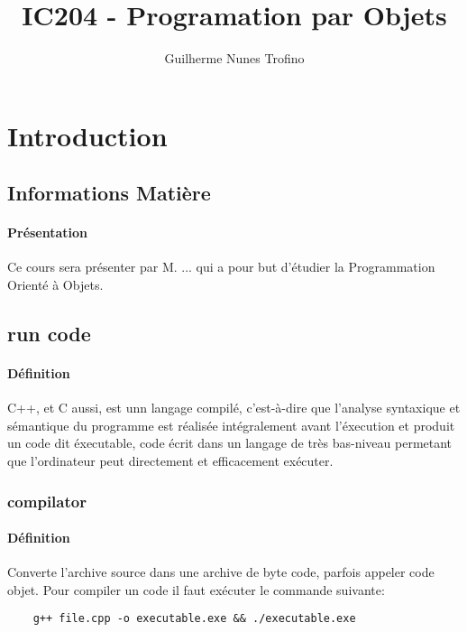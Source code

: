 \documentclass{article}
\title{IC204 - Programation par Objets}
\author{Guilherme Nunes Trofino}
\begin{document}
\maketitle

\newpage\tableofcontents

\section{Introduction}



\subsection{Informations Matière}
\paragraph{Présentation}Ce cours sera présenter par M. ... qui a pour but d'étudier la Programmation Orienté à Objets.

\subsection{run code}
\paragraph{Définition}C++, et C aussi, est unn langage compilé, c'est-à-dire que l'analyse syntaxique et sémantique du programme est réalisée intégralement avant l'éxecution et produit un code dit éxecutable, code écrit dans un langage de très bas-niveau permetant que l'ordinateur peut directement et efficacement exécuter.\\

\subsubsection{compilator}
\paragraph{Définition}Converte l'archive source dans une archive de byte code, parfois appeler code objet. Pour compiler un code il faut exécuter le commande suivante:
\begin{scriptsize}
    \myStyleCPP
    \begin{lstlisting}
    g++ file.cpp -o executable.exe && ./executable.exe
    \end{lstlisting}
\end{scriptsize}
\end{document}

